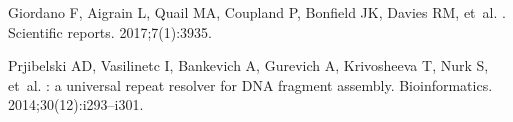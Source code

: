 \documentclass[10pt,letterpaper]{article}
\begin{document}
\begin{thebibliography}{10}
Giordano F, Aigrain L, Quail MA, Coupland P, Bonfield JK, Davies RM, et~al.
.
\newblock Scientific reports. 2017;7(1):3935.

Prjibelski AD, Vasilinetc I, Bankevich A, Gurevich A, Krivosheeva T, Nurk S,
  et~al.
: a universal repeat resolver for {DNA} fragment assembly.
\newblock Bioinformatics. 2014;30(12):i293--i301.

\end{thebibliography}
\end{document}
